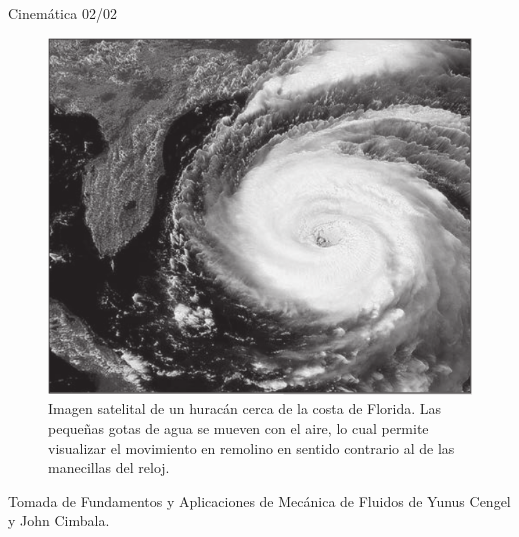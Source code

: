 \begin{frame}{Cinemática 02/02}
\justifying
\begin{figure}[H]
\centering
\includegraphics[scale=0.2]{Section_Files/imagenes/sec02_0400_Fig02-00.png}
\caption{Imagen satelital de un huracán cerca de la costa de Florida. Las pequeñas gotas de agua se mueven con el aire, lo cual permite visualizar el movimiento en remolino en sentido contrario al de las manecillas del reloj.}
\label{fig: Figura2-Fig02-00}
\end{figure}
{\tiny Tomada de Fundamentos y Aplicaciones de Mecánica de Fluidos de Yunus Cengel y John Cimbala.}
\end{frame}


